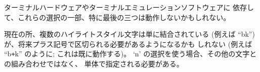 ターミナルハードウェアやターミナルエミュレーションソフトウェアに
依存して、これらの選択の一部、特に最後の三つは動作しないかもしれない。

現在の所、複数のハイライトスタイル文字は単に結合されている
(例えば ``bk'') が、将来プラス記号で区切られる必要があるようになるかも
しれない (例えば ``b\verb&+&k'' のように; これは既に動作する)。
`n' の選択を使う場合、その他の文字との組み合わせではなく、
単体で指定される必要がある。

